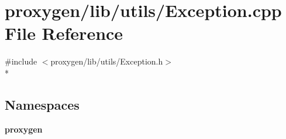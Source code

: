 \section{proxygen/lib/utils/\+Exception.cpp File Reference}
\label{Exception_8cpp}
{\ttfamily \#include $<$proxygen/lib/utils/\+Exception.\+h$>$}\\*
\subsection*{Namespaces}
\begin{DoxyCompactItemize}
\item 
 {\bf proxygen}
\end{DoxyCompactItemize}
